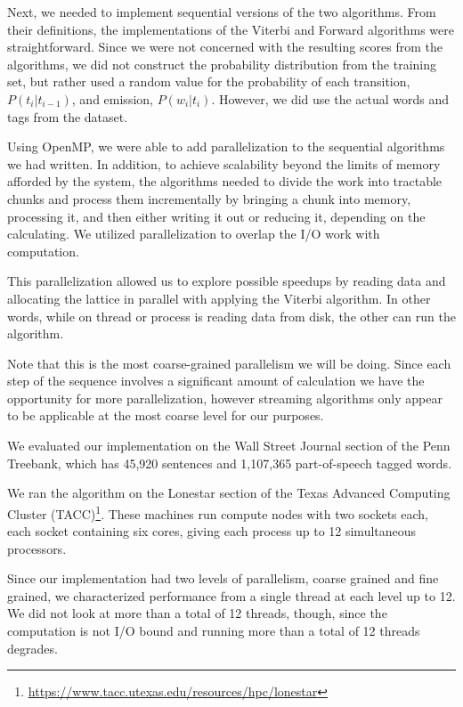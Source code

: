 \documentclass[11pt,onecolumn]{article}
\begin{document}

Next, we needed to implement sequential versions of the two algorithms. From their definitions, the implementations of the Viterbi and Forward algorithms were straightforward. Since we were not concerned with the resulting scores from the algorithms, we did not construct the probability distribution from the training set, but rather used a random value for the probability of each transition, $P(t_{i}|t_{i-1})$, and emission, $P(w_i|t_i)$. However, we did use the actual words and tags from the dataset.


Using OpenMP, we were able to add parallelization to the sequential algorithms we had written. In addition, to achieve scalability beyond the limits of memory afforded by the system, the algorithms needed to divide the work into tractable chunks and process them incrementally by bringing a chunk into memory, processing it, and then either writing it out or reducing it, depending on the calculating. We utilized parallelization to overlap the I/O work with computation. 

This parallelization allowed us to explore possible speedups by reading data and allocating the lattice in parallel with applying the Viterbi algorithm. In other words, while on thread or process is reading data from disk, the other can run the algorithm.

Note that this is the most coarse-grained parallelism we will be doing. Since each step of the sequence involves a significant amount of calculation we have the opportunity for more parallelization, however streaming algorithms only appear to be applicable at the most coarse level for our purposes.


We evaluated our implementation on the Wall Street Journal section of the Penn Treebank, which has 45,920 sentences and 1,107,365 part-of-speech tagged words.

We ran the algorithm on the Lonestar section of the Texas Advanced Computing Cluster (TACC)\footnote{\url{https://www.tacc.utexas.edu/resources/hpc/lonestar}}. These machines run compute nodes with two sockets each, each socket containing six cores, giving each process up to 12 simultaneous processors.


Since our implementation had two levels of parallelism, coarse grained and fine grained, we characterized performance from a single thread at each level up to 12. We did not look at more than a total of 12 threads, though, since the computation is not I/O bound and running more than a total of 12 threads degrades.
\end{document}
